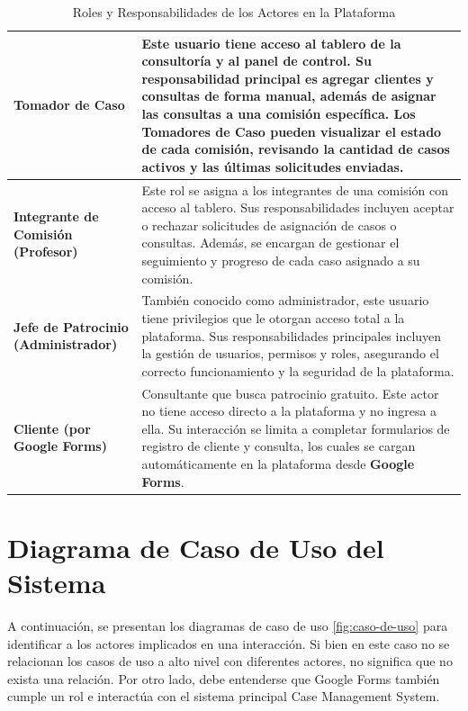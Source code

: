 \begin{table}[H]
    \centering
    \begin{tabular}{|p{3cm}|p{12cm}|}
        \hline
        \textbf{Tomador de Caso} & Este usuario tiene acceso al tablero de la consultoría y al panel de control. Su responsabilidad principal es agregar clientes y consultas de forma manual, además de asignar las consultas a una comisión específica. Los Tomadores de Caso pueden visualizar el estado de cada comisión, revisando la cantidad de casos activos y las últimas solicitudes enviadas.\\
        \hline
        \textbf{Integrante de Comisión (Profesor)} & Este rol se asigna a los integrantes de una comisión con acceso al tablero. Sus responsabilidades incluyen aceptar o rechazar solicitudes de asignación de casos o consultas. Además, se encargan de gestionar el seguimiento y progreso de cada caso asignado a su comisión.\\
        \hline
        \textbf{Jefe de Patrocinio (Administrador)} & También conocido como administrador, este usuario tiene privilegios que le otorgan acceso total a la plataforma. Sus responsabilidades principales incluyen la gestión de usuarios, permisos y roles, asegurando el correcto funcionamiento y la seguridad de la plataforma.\\
        \hline
        \textbf{Cliente (por Google Forms)} & Consultante que busca patrocinio gratuito. Este actor no tiene acceso directo a la plataforma y no ingresa a ella. Su interacción se limita a completar formularios de registro de cliente y consulta, los cuales se cargan automáticamente en la plataforma desde \textbf{Google Forms}.\\
        \hline

    \end{tabular}
    \caption{Roles y Responsabilidades de los Actores en la Plataforma}
    \label{tab:roles-responsabilidades}
\end{table}


\section{Diagrama de Caso de Uso del Sistema}
A continuación, se presentan los diagramas de caso de uso \ref{fig:caso-de-uso} para identificar a los actores implicados en una interacción. Si bien en este caso no se relacionan los casos de uso a alto nivel con diferentes actores, no significa que no exista una relación. Por otro lado, debe entenderse que Google Forms también cumple un rol e interactúa con el sistema principal Case Management System.


